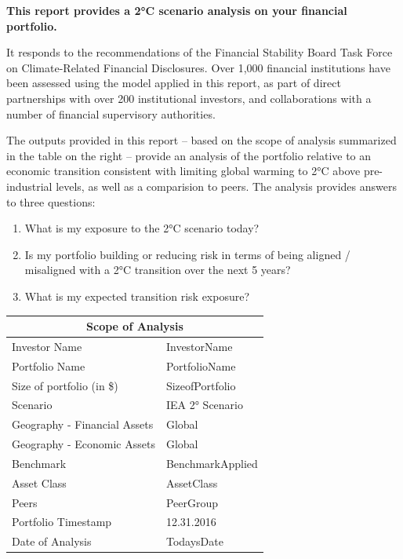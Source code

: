 \documentclass[10pt,table,a4]{article}\usepackage[]{graphicx}\usepackage[]{color}
\begin{document}
	\begin{multicols}{2}
		\textbf{This report provides a 2°C scenario analysis on your financial portfolio.} 
		
		It responds to the recommendations of the Financial Stability Board Task Force on Climate-Related Financial Disclosures. Over 1,000 financial institutions have been assessed using the model applied in this report, as part of direct partnerships with over 200 institutional investors, and collaborations with  a number of financial supervisory authorities. 
		
		The outputs provided in this report – based on the scope of analysis summarized in the table on the right – provide an analysis of the portfolio relative to an economic transition consistent with limiting global warming to 2°C above pre-industrial levels, as well as a comparision to peers. The analysis provides answers to three questions: 
		
		\begin{enumerate}
			\item{What is my exposure to the 2°C scenario today?}
			\item{Is my portfolio building or reducing risk in terms of being aligned / misaligned with a 2°C transition over the next 5 years?}
			\item{What is my expected transition risk exposure?}
		\end{enumerate}
		

			\begin{center}
			{
				\setlength{\tabcolsep}{10pt} %
				\renewcommand{\arraystretch}{1.5} %
				\begin{tabular}{ p{.35\linewidth} p{.49\linewidth} }
					\hline
					\multicolumn{2}{c}{\textbf{Scope of Analysis}} \\
					\hline
					Investor Name & InvestorName  \\
					Portfolio Name & PortfolioName \\ 
					Size of portfolio (in \$) & SizeofPortfolio  \\ 
					Scenario & IEA 2° Scenario  \\ 
					Geography - \newline Financial Assets & Global \\ 
					Geography - \newline Economic Assets & Global  \\ 
					Benchmark & BenchmarkApplied \\
					Asset Class & AssetClass \\ 
					Peers & PeerGroup  \\
					Portfolio Timestamp & 12.31.2016  \\ 
					Date of Analysis & TodaysDate  \\ 
					\hline
				\end{tabular}
			}
			
		\end{center}
		
		
		
		
		\vspace{1.2cm}
		
		
	\end{multicols}	
\end{document}

